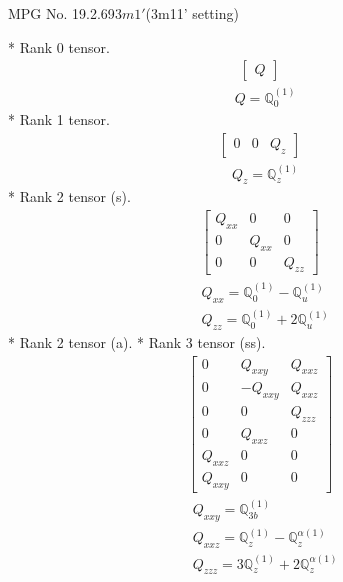 \documentclass[fleqn,8pt,landscape]{jsarticle}
\begin{document}
\setcounter{MaxMatrixCols}{32}

\renewcommand{\tablename}{Table~}
\renewcommand{\figurename}{Figure~}
\begin{center}
\LARGE
MPG No. 19.2.69\quad$3m1'$\quad(3m11' setting)
\end{center}
* Rank 0 tensor.
\begin{align*}
\begin{bmatrix} Q \end{bmatrix}
\end{align*}
\begin{align*}
& Q = \mathbb{Q}_{0}^{(1)}
\end{align*}
* Rank 1 tensor.
\begin{align*}
\begin{bmatrix} 0 & 0 & Q_{z} \end{bmatrix}
\end{align*}
\begin{align*}
& Q_{z} = \mathbb{Q}_{z}^{(1)}
\end{align*}
* Rank 2 tensor (s).
\begin{align*}
\begin{bmatrix} Q_{xx} & 0 & 0 \\ 0 & Q_{xx} & 0 \\ 0 & 0 & Q_{zz} \end{bmatrix}
\end{align*}
\begin{align*}
& Q_{xx} = \mathbb{Q}_{0}^{(1)} - \mathbb{Q}_{u}^{(1)} \\
& Q_{zz} = \mathbb{Q}_{0}^{(1)} + 2 \mathbb{Q}_{u}^{(1)}
\end{align*}
* Rank 2 tensor (a).
* Rank 3 tensor (ss).
\begin{align*}
\begin{bmatrix} 0 & Q_{xxy} & Q_{xxz} \\ 0 & - Q_{xxy} & Q_{xxz} \\ 0 & 0 & Q_{zzz} \\ 0 & Q_{xxz} & 0 \\ Q_{xxz} & 0 & 0 \\ Q_{xxy} & 0 & 0 \end{bmatrix}
\end{align*}
\begin{align*}
& Q_{xxy} = \mathbb{Q}_{3b}^{(1)} \\
& Q_{xxz} = \mathbb{Q}_{z}^{(1)} - \mathbb{Q}_{z}^{\alpha(1)} \\
& Q_{zzz} = 3 \mathbb{Q}_{z}^{(1)} + 2 \mathbb{Q}_{z}^{\alpha(1)}
\end{align*}
\end{document}
